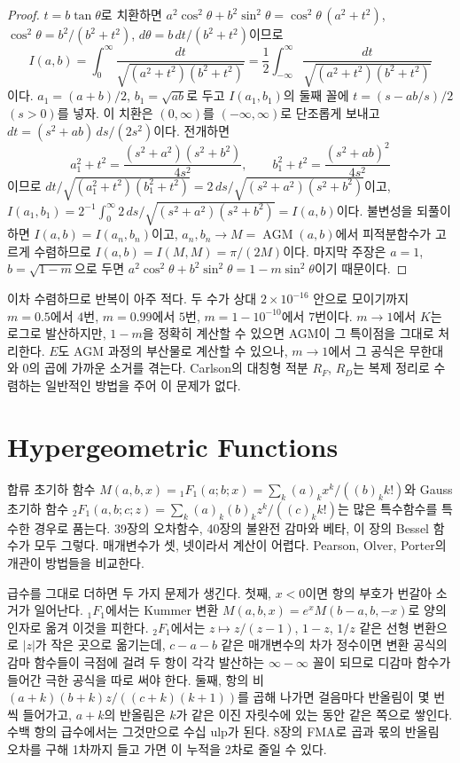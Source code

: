 \begin{proof}
$t=b\tan\theta$로 치환하면 $a^2\cos^2\theta+b^2\sin^2\theta=\cos^2\theta\,(a^2+t^2)$, $\cos^2\theta=b^2/(b^2+t^2)$, $d\theta=b\,dt/(b^2+t^2)$이므로
\[
I(a,b)=\int_0^\infty\frac{dt}{\sqrt{(a^2+t^2)(b^2+t^2)}}=\frac12\int_{-\infty}^\infty\frac{dt}{\sqrt{(a^2+t^2)(b^2+t^2)}}
\]
이다. $a_1=(a+b)/2$, $b_1=\sqrt{ab}$로 두고 $I(a_1,b_1)$의 둘째 꼴에 $t=(s-ab/s)/2$ $(s>0)$를 넣자. 이 치환은 $(0,\infty)$를 $(-\infty,\infty)$로 단조롭게 보내고 $dt=(s^2+ab)\,ds/(2s^2)$이다. 전개하면
\[
a_1^2+t^2=\frac{(s^2+a^2)(s^2+b^2)}{4s^2},\qquad b_1^2+t^2=\frac{(s^2+ab)^2}{4s^2}
\]
이므로 $dt/\sqrt{(a_1^2+t^2)(b_1^2+t^2)}=2\,ds/\sqrt{(s^2+a^2)(s^2+b^2)}$이고, $I(a_1,b_1)=2^{-1}\int_0^\infty2\,ds/\sqrt{(s^2+a^2)(s^2+b^2)}=I(a,b)$이다. 불변성을 되풀이하면 $I(a,b)=I(a_n,b_n)$이고, $a_n,b_n\to M=\operatorname{AGM}(a,b)$에서 피적분함수가 고르게 수렴하므로 $I(a,b)=I(M,M)=\pi/(2M)$이다. 마지막 주장은 $a=1$, $b=\sqrt{1-m}$으로 두면 $a^2\cos^2\theta+b^2\sin^2\theta=1-m\sin^2\theta$이기 때문이다\cite{cox1984agm,borwein1987pi}.
\end{proof}

이차 수렴하므로 반복이 아주 적다. 두 수가 상대 $2\times10^{-16}$ 안으로 모이기까지 $m=0.5$에서 $4$번, $m=0.99$에서 $5$번, $m=1-10^{-10}$에서 $7$번이다. $m\to1$에서 $K$는 로그로 발산하지만, $1-m$을 정확히 계산할 수 있으면 AGM이 그 특이점을 그대로 처리한다. $E$도 AGM 과정의 부산물로 계산할 수 있으나, $m\to1$에서 그 공식은 무한대와 $0$의 곱에 가까운 소거를 겪는다. Carlson의 대칭형 적분 $R_F$, $R_D$는 복제 정리로 수렴하는 일반적인 방법을 주어 이 문제가 없다\cite{carlson1995}.

\section{Hypergeometric Functions}
\label{sec:hypergeometric}

합류 초기하 함수 $M(a,b,x)={}_1F_1(a;b;x)=\sum_k(a)_kx^k/((b)_kk!)$와 Gauss 초기하 함수 ${}_2F_1(a,b;c;z)=\sum_k(a)_k(b)_kz^k/((c)_kk!)$는 많은 특수함수를 특수한 경우로 품는다. 39장의 오차함수, 40장의 불완전 감마와 베타, 이 장의 Bessel 함수가 모두 그렇다. 매개변수가 셋, 넷이라서 계산이 어렵다. Pearson, Olver, Porter의 개관이 방법들을 비교한다\cite{pearson2017hyp}.

급수를 그대로 더하면 두 가지 문제가 생긴다. 첫째, $x<0$이면 항의 부호가 번갈아 소거가 일어난다. ${}_1F_1$에서는 Kummer 변환 $M(a,b,x)=e^xM(b-a,b,-x)$로 양의 인자로 옮겨 이것을 피한다. ${}_2F_1$에서는 $z\mapsto z/(z-1)$, $1-z$, $1/z$ 같은 선형 변환으로 $|z|$가 작은 곳으로 옮기는데, $c-a-b$ 같은 매개변수의 차가 정수이면 변환 공식의 감마 함수들이 극점에 걸려 두 항이 각각 발산하는 $\infty-\infty$ 꼴이 되므로 디감마 함수가 들어간 극한 공식을 따로 써야 한다. 둘째, 항의 비 $(a+k)(b+k)z/((c+k)(k+1))$를 곱해 나가면 걸음마다 반올림이 몇 번씩 들어가고, $a+k$의 반올림은 $k$가 같은 이진 자릿수에 있는 동안 같은 쪽으로 쌓인다. 수백 항의 급수에서는 그것만으로 수십 ulp가 된다. 8장의 FMA로 곱과 몫의 반올림 오차를 구해 1차까지 들고 가면 이 누적을 2차로 줄일 수 있다.


